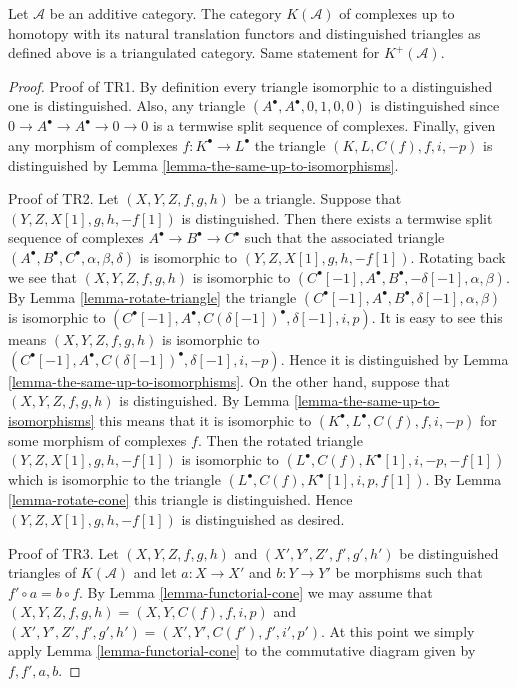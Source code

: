 \begin{proposition}
\label{proposition-homotopy-category-triangulated}
Let $\mathcal{A}$ be an additive category.
The category $K(\mathcal{A})$ of complexes up to
homotopy with its natural translation functors
and distinguished triangles as defined above
is a triangulated category. Same statement for
$K^{+}(\mathcal{A})$.
\end{proposition}

\begin{proof}
Proof of TR1. By definition every triangle isomorphic to a distinguished
one is distinguished. Also, any triangle $(A^\bullet, A^\bullet, 0, 1, 0, 0)$
is distinguished since $0 \to A^\bullet \to A^\bullet \to 0 \to 0$ is
a termwise split sequence of complexes. Finally, given any morphism of
complexes $f : K^\bullet \to L^\bullet$ the triangle
$(K, L, C(f), f, i, -p)$ is distinguished by
Lemma \ref{lemma-the-same-up-to-isomorphisms}.

\medskip\noindent
Proof of TR2.
Let $(X, Y, Z, f, g, h)$ be a triangle.
Suppose that $(Y, Z, X[1], g, h, -f[1])$ is distinguished.
Then there exists a termwise split sequence of complexes
$A^\bullet \to B^\bullet \to C^\bullet$ such that the associated
triangle $(A^\bullet, B^\bullet, C^\bullet, \alpha, \beta, \delta)$
is isomorphic to $(Y, Z, X[1], g, h, -f[1])$. Rotating back we see
that $(X, Y, Z, f, g, h)$ is isomorphic to
$(C^\bullet[-1], A^\bullet, B^\bullet, -\delta[-1], \alpha, \beta)$.
By Lemma \ref{lemma-rotate-triangle} the triangle
$(C^\bullet[-1], A^\bullet, B^\bullet, \delta[-1], \alpha, \beta)$
is isomorphic to
$(C^\bullet[-1], A^\bullet, C(\delta[-1])^\bullet, \delta[-1], i, p)$.
It is easy to see this means $(X, Y, Z, f, g, h)$
is isomorphic to
$(C^\bullet[-1], A^\bullet, C(\delta[-1])^\bullet, \delta[-1], i, -p)$.
Hence it is distinguished by
Lemma \ref{lemma-the-same-up-to-isomorphisms}.
On the other hand, suppose that $(X, Y, Z, f, g, h)$ is distinguished.
By Lemma \ref{lemma-the-same-up-to-isomorphisms} this means that it is
isomorphic to $(K^\bullet, L^\bullet, C(f), f, i, -p)$ for some morphism of
complexes $f$. Then the rotated triangle $(Y, Z, X[1], g, h, -f[1])$ is
isomorphic to $(L^\bullet, C(f), K^\bullet[1], i, -p, -f[1])$ which is
isomorphic to the triangle $(L^\bullet, C(f), K^\bullet[1], i, p, f[1])$.
By Lemma \ref{lemma-rotate-cone} this triangle is distinguished.
Hence $(Y, Z, X[1], g, h, -f[1])$ is distinguished as desired.

\medskip\noindent
Proof of TR3. Let
$(X, Y, Z, f, g, h)$ and $(X', Y', Z', f', g', h')$
be distinguished triangles of $K(\mathcal{A})$
and let $a : X \to X'$ and $b : Y \to Y'$ be morphisms
such that $f' \circ a = b \circ f$. By Lemma \ref{lemma-functorial-cone}
we may assume that
$(X, Y, Z, f, g, h) = (X, Y, C(f), f, i, p)$ and
$(X', Y', Z', f', g', h') = (X', Y', C(f'), f', i', p')$.
At this point we simply apply Lemma \ref{lemma-functorial-cone}
to the commutative diagram given by $f, f', a, b$.


\end{proof}
